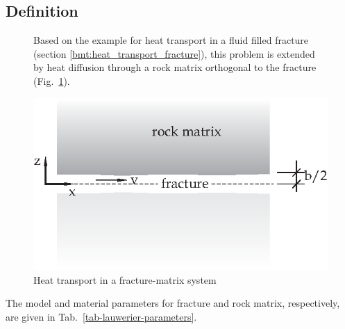 \subsection{Definition}

\vspace{-0.5cm}

\begin{figure}[!htb]
\begin{minipage}[t]{0.48\textwidth}
\vspace{-2.5cm}
Based on the example for heat transport in a fluid filled fracture (section \ref{bmt:heat_transport_fracture}), this problem is extended by heat diffusion through a rock matrix orthogonal to the fracture (Fig.~\ref{fig-lauwerier-problem}). 
\end{minipage}
\hspace{0.02\textwidth}
\begin{minipage}[t]{0.48\textwidth}
\centering
\includegraphics[scale=0.7]{PART_II/T/lauwerier-problem.eps}
\caption{\label{fig-lauwerier-problem} Heat transport in a fracture-matrix system}
\end{minipage}
\end{figure}

The model and material parameters for fracture and rock matrix, respectively, are given in Tab.~\ref{tab-lauwerier-parameters}.


